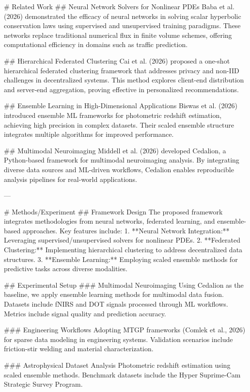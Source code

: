 # Related Work  
## Neural Network Solvers for Nonlinear PDEs  
Baba et al. (2026) demonstrated the efficacy of neural networks in solving scalar hyperbolic conservation laws using supervised and unsupervised training paradigms. These networks replace traditional numerical flux in finite volume schemes, offering computational efficiency in domains such as traffic prediction.

## Hierarchical Federated Clustering  
Cai et al. (2026) proposed a one-shot hierarchical federated clustering framework that addresses privacy and non-IID challenges in decentralized systems. This method explores client-end distribution and server-end aggregation, proving effective in personalized recommendations.

## Ensemble Learning in High-Dimensional Applications  
Biswas et al. (2026) introduced ensemble ML frameworks for photometric redshift estimation, achieving high precision in complex datasets. Their scaled ensemble structure integrates multiple algorithms for improved performance.

## Multimodal Neuroimaging  
Middell et al. (2026) developed Cedalion, a Python-based framework for multimodal neuroimaging analysis. By integrating diverse data sources and ML-driven workflows, Cedalion enables reproducible analysis pipelines for real-world applications.

---

# Methods/Experiment  
## Framework Design  
The proposed framework integrates methodologies from neural networks, federated learning, and ensemble-based approaches. Key features include:  
1. **Neural Network Integration:** Leveraging supervised/unsupervised solvers for nonlinear PDEs.  
2. **Federated Clustering:** Implementing hierarchical clustering to address decentralized data structures.  
3. **Ensemble Learning:** Employing scaled ensemble methods for predictive tasks across diverse modalities.

## Experimental Setup  
### Multimodal Neuroimaging  
Using Cedalion as the baseline, we apply ensemble learning methods for multimodal data fusion. Datasets include fNIRS and DOT signals processed through ML workflows. Metrics include signal quality and prediction accuracy.

### Engineering Workflows  
Adopting MTGP frameworks (Comlek et al., 2026) for sparse data modeling in engineering systems. Validation scenarios include friction-stir welding and material characterization.

### Astrophysical Dataset Analysis  
Photometric redshift estimation using scaled ensemble methods. Benchmark datasets include the Hyper Suprime-Cam Strategic Survey Program.

